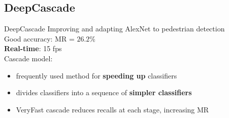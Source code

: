 %

\subsection{DeepCascade}
\begin{frame}{DeepCascade}
  \small
  Improving and adapting AlexNet to pedestrian detection\\
  Good accuracy: MR = $26.2\%$\\
  \textbf{Real-time}: 15 fps\\
  Cascade model:
  \begin{itemize}
    \item frequently used method for \textbf{speeding up} classifiers
    \item divides classifiers into a sequence of \textbf{simpler classifiers}
    \item VeryFast cascade reduces recalls at each stage, increasing MR
  \end{itemize}
\end{frame}

